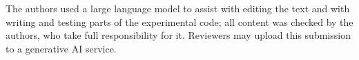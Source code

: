 \documentclass[runningheads]{llncs}
\begin{document}






\label{end-of-main-body}%

\begin{credits}
\subsubsection{\ackname}
The authors used a large language model to assist with editing the text and with writing and testing parts of the experimental code; all content was checked by the authors, who take full responsibility for it. Reviewers may upload this submission to a generative AI service.
\end{credits}




\appendix


\end{document}
